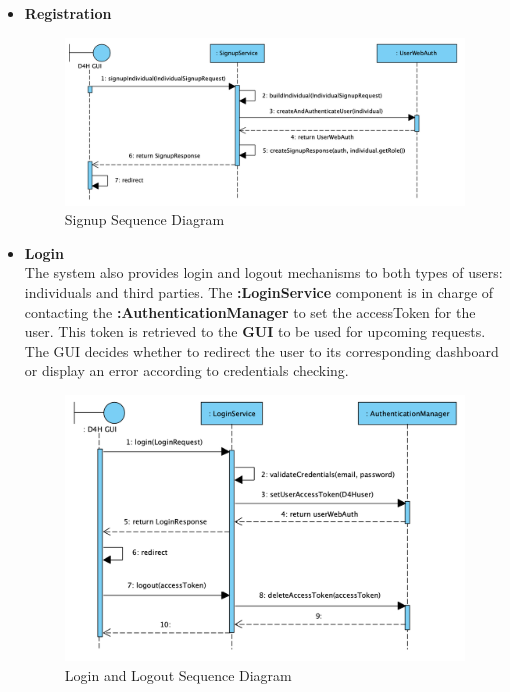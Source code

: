\documentclass[a4paper, hidelinks, 12pt]{report}
\begin{document}
	\begin{itemize}
	\item \textbf{Registration} 
	\begin{figure}[H]
		\centering
		\includegraphics[width=1\textwidth]{diagrams/sequence_diagrams/d4h_signup.png}
		\caption[Signup Sequence Diagram]{Signup Sequence Diagram}
		\label{fig:d4h_seq_signup}
	\end{figure}
	
	\item \textbf{Login} \\
	The system also provides login and logout mechanisms to both types of users: individuals and third parties. The \textbf{:LoginService} component is in charge of contacting the \textbf{:AuthenticationManager} to set the accessToken for the user. This token is retrieved to the \textbf{GUI} to be used for upcoming requests. The GUI decides whether to redirect the user to its corresponding dashboard or display an error according to credentials checking. \\
	
	\begin{figure}[H]
		\centering
		\includegraphics[width=1\textwidth]{diagrams/sequence_diagrams/d4h_login_logout.png}
		\caption[Login and Logout Sequence Diagram]{Login and Logout Sequence Diagram}
		\label{fig:d4h_seq_login_logout}
	\end{figure}
	

\end{itemize}
\end{document}

